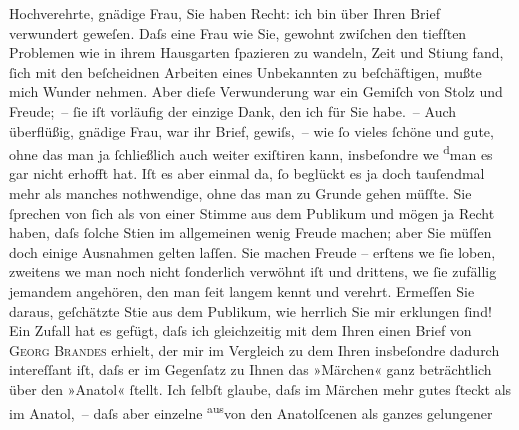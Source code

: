 \pstart{}Hochverehrte, gnädige Frau,\pend\vspace{0.5em}
\pstart
           Sie haben Recht: ich bin über Ihren Brief verwundert geweſen. Daſs eine Frau wie Sie,
               gewohnt zwiſchen den tiefſten Problemen wie in ihrem Hausgarten ſpazieren zu wandeln,
               Zeit und Sti{\geminationm}ung fand, ſich mit den beſcheidnen Arbeiten
               eines Unbekannten zu beſchäftigen, mußte mich Wunder nehmen. Aber dieſe Verwunderung
                  {\pb}war ein Gemiſch von Stolz und Freude; – ſie iſt vorläufig der einzige
               Dank, den ich für Sie habe. – Auch überflüßig, gnädige Frau, war ihr Brief, gewiſs, –
               wie ſo vieles ſchöne und gute, ohne das man ja ſchließlich auch weiter exiſtiren
               kann, insbeſondre we{\geminationn}{ }\substVorne{}\textsuperscript{d}\substDazwischen{}m\substHinten{}an es gar nicht erhofft hat. Iſt es aber einmal da, ſo beglückt es ja doch
               tauſendmal mehr als manches noth{\pb}wendige, ohne das man zu Grunde gehen
               müſſte. Sie ſprechen von ſich als von einer Stimme aus dem Publikum und mögen ja
               Recht haben, daſs ſolche Sti{\geminationm}en im allgemeinen wenig
               Freude machen; aber Sie müſſen doch einige Ausnahmen gelten laſſen. Sie machen Freude
               – erſtens we{\geminationn}{ }ſie loben, zweitens we{\geminationn}{ }{\pb}man noch nicht ſonderlich verwöhnt iſt und drittens, we{\geminationn}{ }ſie zufällig jemandem angehören, den man ſeit
               langem kennt und verehrt. Ermeſſen Sie daraus, geſchätzte Sti{\geminationm}e aus dem Publikum, wie herrlich Sie mir erklungen
               ſind! Ein Zufall hat es gefügt, daſs ich gleichzeitig mit dem Ihren einen Brief von
                  \textsc{Georg Brandes} erhielt, der mir im {\pb}Vergleich zu dem Ihren insbeſondre dadurch
               intereſſant iſt, daſs er im Gegenſatz zu Ihnen das »Märchen« ganz beträchtlich über den »Anatol« ſtellt. Ich ſelbſt glaube, daſs im Märchen mehr gutes ſteckt als im Anatol, – daſs aber einzelne \substVorne{}\textsuperscript{aus}\substDazwischen{}von\substHinten{} den Anatolſcenen als ganzes gelungener
